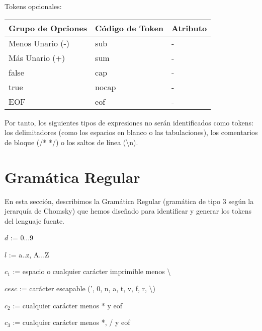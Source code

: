 \documentclass{article}
\begin{document}
Tokens opcionales:
\begin{table}[h!]
    \centering
    \begin{tabular}{|l|l|l|}
        \hline
        \textbf{Grupo de Opciones} & \textbf{Código de Token} & \textbf{Atributo} \\ \hline
        Menos Unario (-) & sub & - \\ \hline
        Más Unario (+) & sum & - \\ \hline
        false & cap & - \\ \hline
        true & nocap & - \\ \hline
        EOF & eof & - \\ \hline
    \end{tabular}
\end{table}

Por tanto, los siguientes tipos de expresiones no serán identificados como tokens: los delimitadores (como los espacios en blanco o las tabulaciones), los comentarios de bloque (/* */) o los saltos de línea (\textbackslash n).

\section{Gramática Regular}

En esta sección, describimos la Gramática Regular (gramática de tipo 3 según la jerarquía de Chomsky) que hemos diseñado para identificar y generar los tokens del lenguaje fuente. 

\vspace{0.1cm}

\begin{center}
    \begin{tcolorbox}[title=Símbolos no terminales, width=0.57\textwidth]
        $d$ := 0...9
        
        $l$ := a..z, A...Z
        
        $c_1$ := espacio o cualquier carácter imprimible menos \textbackslash
        
        $cesc$ := carácter escapable (', 0, n, a, t, v, f, r, \textbackslash )
        
        $c_2$ := cualquier carácter menos * y eof
        
        $c_3$ := cualquier carácter menos *, / y eof
    \end{tcolorbox}
\end{center}
\end{document}
